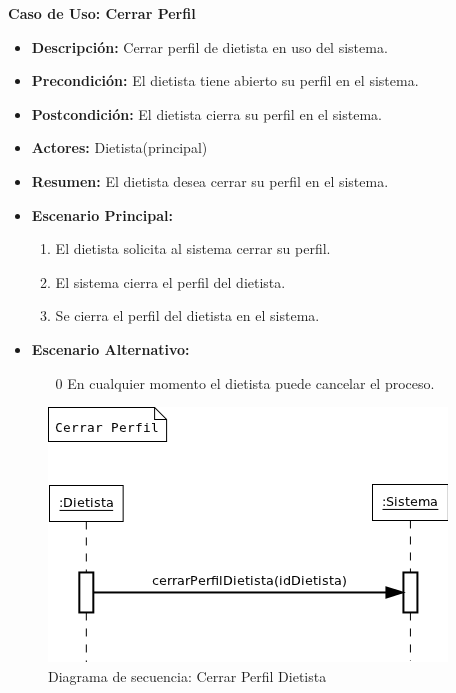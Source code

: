 \textbf{Caso de Uso: Cerrar Perfil}
\begin{itemize}
\item \textbf{Descripción:} Cerrar perfil de dietista en uso del sistema.
\item \textbf{Precondición:} El dietista tiene abierto su perfil en el sistema.
\item \textbf{Postcondición:} El dietista cierra su perfil en el sistema.
\item \textbf{Actores:} Dietista(principal)
\item \textbf{Resumen:} El dietista desea cerrar su perfil en el sistema.
\item \textbf{Escenario Principal:}
\begin{enumerate}
\item El dietista solicita al sistema cerrar su perfil.
\item El sistema cierra el perfil del dietista.
\item Se cierra el perfil del dietista en el sistema.
\end{enumerate}
\item \textbf{Escenario Alternativo:}
\begin{enumerate}
\item[0] En cualquier momento el dietista puede cancelar el proceso.
\end{enumerate}
\end{itemize}
\begin{figure}[H]
  \label{ds_cerrardietista}
  \begin{center}
    \includegraphics[scale=0.7]{../img/DS_CerrarDietista.png}
  \end{center}
  \caption{Diagrama de secuencia: Cerrar Perfil Dietista}
\end{figure}

